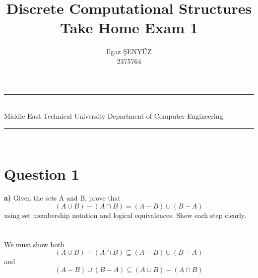\documentclass[a4paper,12pt]{article}
\title{Discrete Computational Structures \\ Take Home Exam 1}
\author{Ilgaz ŞENYÜZ \\ 2375764} %
\date{} %
\newcommand{\HRule}{\rule{\linewidth}{1mm}}
\newcommand\tab[1][1cm]{\hspace*{#1}}
\begin{document}
\HRule\\
Middle East Technical University \hfill Department of Computer Engineering
{\let\newpage\relax\maketitle}
\HRule\\
\vspace{1cm}


\section*{Question 1 \hfill {}}

\tab \textbf{a)} Given the sets A and B, prove that
\begin{equation*}
(A \cup B) - (A \cap B) = (A - B) \cup (B - A)
\end{equation*} 
\tab using set membership notation and logical equivalences. Show each step clearly. \\ \\ \\
We must show both \begin{equation*}
(A \cup B) - (A \cap B) \subseteq (A - B) \cup (B - A)
\end{equation*} 
and \begin{equation*}
 (A - B) \cup (B - A) \subseteq 
(A \cup B) - (A \cap B) \end{equation*} 
\end{document}
